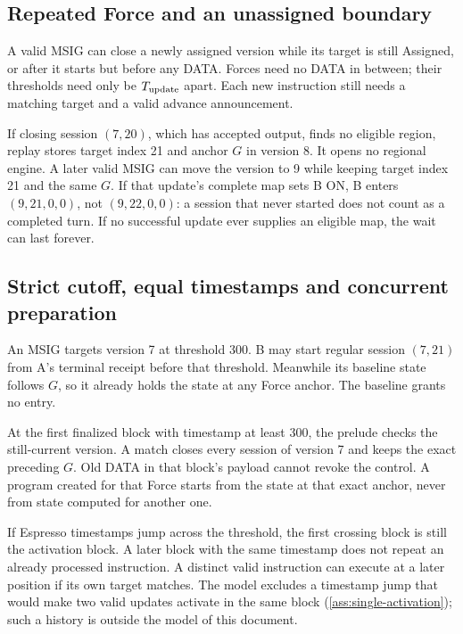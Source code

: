\documentclass[11pt,a4paper]{article}
\begin{document}
\subsection{Repeated Force and an unassigned boundary}
\label{sec:repeated-force}
A valid MSIG can close a newly assigned version while its target is
still Assigned, or after it starts but before any DATA. Forces need no DATA
in between; their thresholds need only be $T_{\rm update}$ apart. Each
new instruction still needs a matching
target and a valid advance announcement.

If closing session $(7,20)$, which has accepted output, finds no eligible
region, replay stores target index 21 and anchor $G$ in version 8. It
opens no regional engine. A later valid MSIG can move the version to 9
while keeping target index 21 and the same $G$. If that update's complete
map sets B ON, B enters $(9,21,0,0)$, not $(9,22,0,0)$: a session that
never started does not count as a completed turn. If no successful update
ever supplies an eligible map, the wait can last forever.

\subsection{Strict cutoff, equal timestamps and concurrent preparation}
\label{sec:cutoff-example}
An MSIG targets version 7 at threshold 300. B may start regular session
$(7,21)$ from A's terminal receipt before that threshold. Meanwhile its
baseline state follows $G$, so it already holds the state at any Force
anchor. The baseline grants no entry.

At the first finalized block with timestamp at least 300, the prelude
checks the still-current version. A match closes every session of
version 7 and keeps the exact preceding $G$. Old DATA in that block's
payload cannot revoke the control. A program created for that
Force starts from the state at that exact anchor, never from state
computed for another one.

If Espresso timestamps jump across the threshold, the first crossing
block is still the activation block. A later block with the same
timestamp does not repeat an already processed instruction. A distinct
valid instruction can execute at a later position if its own target
matches. The model excludes a timestamp jump that would make two valid
updates activate in the same block (\cref{ass:single-activation}); such a
history is outside the model of this document.
\end{document}
